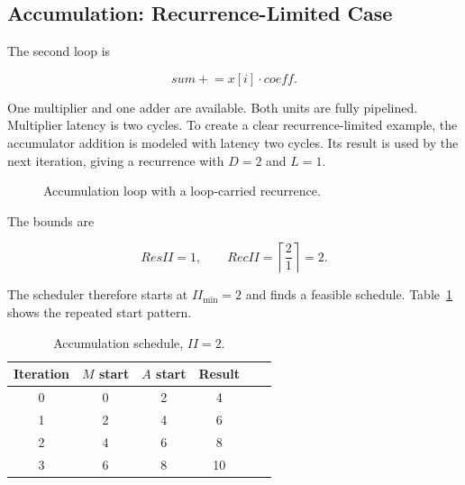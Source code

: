 \documentclass[conference]{IEEEtran}
\begin{document}
\subsection{Accumulation: Recurrence-Limited Case}

The second loop is

\begin{equation}
sum \mathrel{+}= x[i]\cdot coeff .
\end{equation}

One multiplier and one adder are available. Both units are fully pipelined.
Multiplier latency is two cycles. To create a clear recurrence-limited example,
the accumulator addition is modeled with latency two cycles. Its result is used by
the next iteration, giving a recurrence with $D=2$ and $L=1$.

\begin{figure}[t]
\centering
{}
\caption{Accumulation loop with a loop-carried recurrence.}
\label{fig:acc}
\end{figure}

The bounds are

\begin{equation}
ResII=1,\qquad
RecII=\left\lceil\frac{2}{1}\right\rceil=2.
\end{equation}

The scheduler therefore starts at $II_{\min}=2$ and finds a feasible schedule.
Table~\ref{tab:acc} shows the repeated start pattern.

\begin{table}[t]
\centering
\caption{Accumulation schedule, $II=2$.}
\label{tab:acc}
\begin{tabular}{@{}cccccc@{}}
\toprule
Iteration & $M$ start & $A$ start & Result\\
\midrule
0 & 0 & 2 & 4\\
1 & 2 & 4 & 6\\
2 & 4 & 6 & 8\\
3 & 6 & 8 & 10\\
\bottomrule
\end{tabular}
\end{table}
\end{document}
